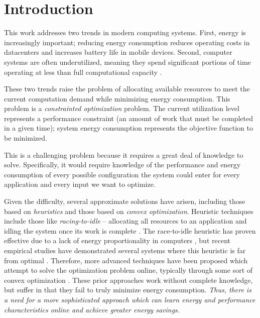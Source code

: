 
\section{Introduction}

This work addresses two trends in modern computing systems.  First, energy is increasingly important; reducing energy consumption reduces operating costs in datacenters and increases battery life in mobile devices.  Second, computer systems are often underutilized, meaning they spend significant portions of time operating at less than full computational capacity \cite{}.

These two trends raise the problem of allocating available resources to meet the current computation demand while minimizing energy consumption. This problem is a \emph{constrainted optimization} problem. The current utilization level represents a performance constraint (\ie an amount of work that must be completed in a given time); system energy consumption represents the objective function to be minimized.

This is a challenging problem because it requires a great deal of knowledge to solve.  Specifically, it would require knowledge of the performance and energy consumption of every possible configuration the system could enter for every application and every input we want to optimize.

Given the difficulty, several approximate solutions have arisen, including those based on \emph{heuristics} and those based on \emph{convex optimization}.  Heuristic techniques include those like \emph{racing-to-idle} -- allocating all resources to an application and idling the system once its work is complete \cite{}.  The race-to-idle heuristic has proven effective due to a lack of energy proportionality in computers \cite{}, but recent empirical studies have demonstrated several systems where this heuristic is far from optimal \cite{}.  Therefore, more advanced techniques have been proposed which attempt to solve the optimization problem online, typically through some sort of convex optimization \cite{}. These prior approaches work without complete knowledge, but suffer in that they fail to truly minimize energy consumption.  \emph{Thus, there is a need for a more sophisticated approach which can learn energy and performance characteristics online and achieve greater energy savings.}

